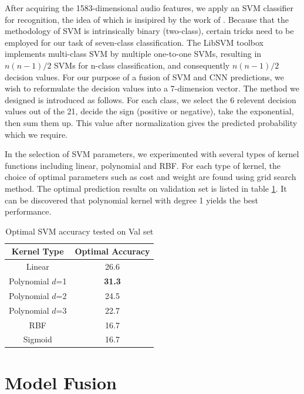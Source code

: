 \documentclass[10pt,twocolumn,letterpaper]{article}
\begin{document}
After acquiring the 1583-dimensional audio features, we apply an SVM classifier for recognition, the idea of which is insipired by the work of \cite{fan2016video}. Because that the methodology of SVM is intrinsically binary (two-class), certain tricks need to be employed for our task of seven-class classification. The LibSVM \cite{CC01a} toolbox implements multi-class SVM by multiple one-to-one SVMs, resulting in $n(n-1)/2$ SVMs for n-class classification, and consequently $n(n-1)/2$ decision values. For our purpose of a fusion of SVM and CNN predictions, we wish to reformulate the decision values into a 7-dimension vector. The method we designed is introduced as follows. For each class, we select the 6 relevent decision values out of the 21, decide the sign (positive or negative), take the exponential, then sum them up. This value after normalization gives the predicted probability which we require.

In the selection of SVM parameters, we experimented with several types of kernel functions including linear, polynomial and RBF. For each type of kernel, the choice of optimal parameters such as cost and weight are found using grid search method. The optimal prediction results on validation set is listed in table \ref{tableSVM}. It can be discovered that polynomial kernel with degree 1 yields the best performance. 

\begin{table}[htpb]
   \begin{center}
      \begin{tabular}{|c|c|}
         \hline
         \textbf{Kernel Type} & \textbf{Optimal Accuracy}\\
         \hline\hline
         Linear & 26.6\\
         \hline
         Polynomial $d$=1 & \textbf{31.3} \\
         \hline
         Polynomial $d$=2 & 24.5 \\
         \hline
         Polynomial $d$=3 & 22.7 \\
         \hline
         RBF & 16.7 \\
         \hline
         Sigmoid & 16.7 \\
         \hline
      \end{tabular}
   \end{center}
   \caption{Optimal SVM accuracy tested on Val set}
   \label{tableSVM}
\end{table}

\section{Model Fusion}
\end{document}
